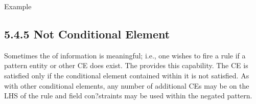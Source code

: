 \documentclass[letterpaper,10pt,english]{sphinxmanual}
\begin{document}

\begin{sphinxVerbatim}[commandchars=\\\{\}]
   
\end{sphinxVerbatim}

Example

\begin{sphinxVerbatim}[commandchars=\\\{\}]
 
   
     
            
    
        
    
\end{sphinxVerbatim}


\subsection{5.4.5 Not Conditional Element}
\label{\detokenize{defrule:not-conditional-element}}
Sometimes the  of information is meaningful; i.e., one wishes to
fire a rule if a pattern entity or other CE does  exist. The
  provides this capability. The  CE
is satisfied only if the conditional element contained within it is not
satisfied. As with other conditional elements, any number of additional
CEs may be on the LHS of the rule and field con?straints may be used
within the negated pattern.


\begin{sphinxVerbatim}[commandchars=\\\{\}]
   
\end{sphinxVerbatim}
\end{document}
